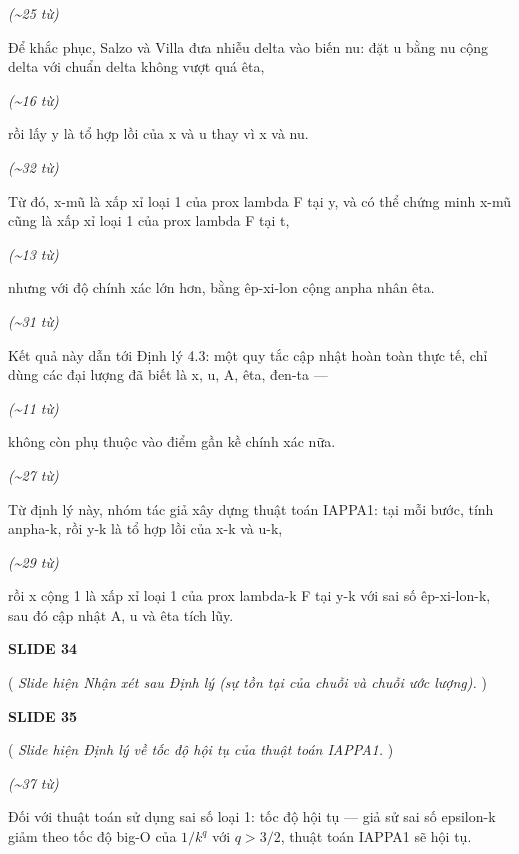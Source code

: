 ﻿\documentclass[12pt]{article}
\newcommand{\scene}[1]{
    \vspace{18pt}
    \normalsize
    \noindent\textbf{\MakeUppercase{#1}}
    \vspace{12pt}
}
\newcommand{\action}[1]{
    \vspace{6pt}
    \small
    \noindent(\textit{#1})
    \vspace{6pt}
}
\newenvironment{speech}{
    \normalsize
    \begin{list}{}{
        \leftmargin=1.25in
        \rightmargin=1.25in
        \parsep=0pt
        \topsep=0pt
        \partopsep=0pt
    }
    \item[]
}{
    \end{list}
    \vspace{6pt}
}
\newcommand{\block}[1]{
    \vspace{4pt}
    \noindent\hspace{1.5in}\textit{(\textasciitilde #1 từ)}
}
\begin{document}
\block{25}
\begin{speech}
    Để khắc phục, Salzo và Villa đưa nhiễu delta vào biến nu: đặt u bằng nu cộng delta với chuẩn delta không vượt quá êta,
\end{speech}

\block{16}
\begin{speech}
    rồi lấy y là tổ hợp lồi của x và u thay vì x và nu.
\end{speech}

\block{32}
\begin{speech}
    Từ đó, x-mũ là xấp xỉ loại 1 của prox lambda F tại y, và có thể chứng minh x-mũ cũng là xấp xỉ loại 1 của prox lambda F tại t,
\end{speech}

\block{13}
\begin{speech}
    nhưng với độ chính xác lớn hơn, bằng êp-xi-lon cộng anpha nhân êta.
\end{speech}

\block{31}
\begin{speech}
    Kết quả này dẫn tới Định lý 4.3: một quy tắc cập nhật hoàn toàn thực tế, chỉ dùng các đại lượng đã biết là x, u, A, êta, đen-ta —
\end{speech}

\block{11}
\begin{speech}
    không còn phụ thuộc vào điểm gần kề chính xác nữa.
\end{speech}

\block{27}
\begin{speech}
    Từ định lý này, nhóm tác giả xây dựng thuật toán IAPPA1: tại mỗi bước, tính anpha-k, rồi y-k là tổ hợp lồi của x-k và u-k,
\end{speech}

\block{29}
\begin{speech}
    rồi x cộng 1 là xấp xỉ loại 1 của prox lambda-k F tại y-k với sai số êp-xi-lon-k, sau đó cập nhật A, u và êta tích lũy.
\end{speech}

\scene{SLIDE 34}

\action{
    Slide hiện Nhận xét sau Định lý (sự tồn tại của chuỗi và chuỗi ước lượng).
}

\scene{SLIDE 35}

\action{
    Slide hiện Định lý về tốc độ hội tụ của thuật toán IAPPA1.
}

\block{37}
\begin{speech}
    Đối với thuật toán sử dụng sai số loại 1: tốc độ hội tụ — giả sử sai số epsilon-k giảm theo tốc độ big-O của $1/k^q$ với $q > 3/2$, thuật toán IAPPA1 sẽ hội tụ.
\end{speech}
\end{document}
